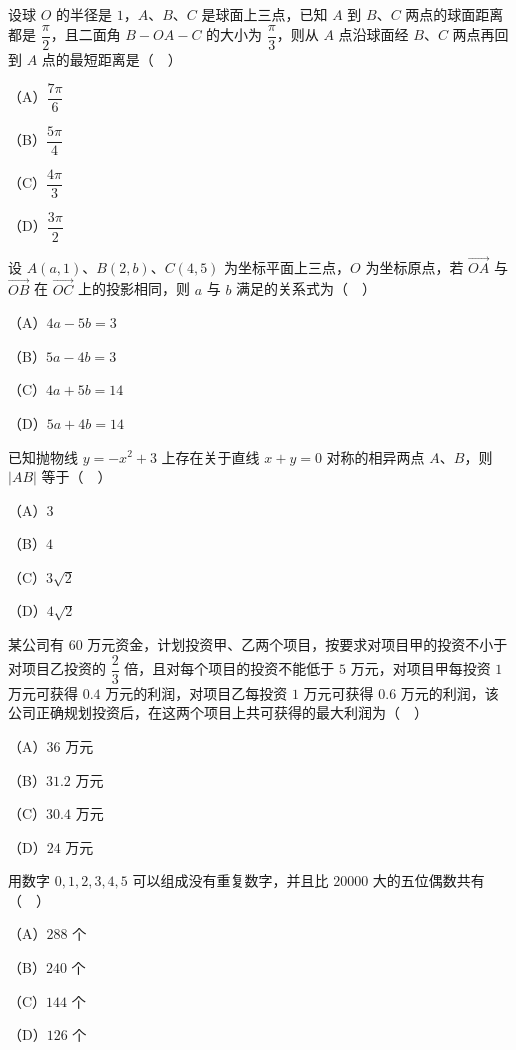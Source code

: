 \begin{question}
设球 $O$ 的半径是 $1$，$A$、$B$、$C$ 是球面上三点，已知 $A$ 到 $B$、$C$ 两点的球面距离都是 $\dfrac{\pi}{2}$，且二面角 $B-OA-C$ 的大小为 $\dfrac{\pi}{3}$，则从 $A$ 点沿球面经 $B$、$C$ 两点再回到 $A$ 点的最短距离是（　）
\nopagebreak[4]
\begin{center}\end{center}
\nopagebreak[4]
（A）$\dfrac{7\pi}{6}$

（B）$\dfrac{5\pi}{4}$

（C）$\dfrac{4\pi}{3}$

（D）$\dfrac{3\pi}{2}$

\end{question}
\begin{question}
设 $A(a,1)$、$B(2,b)$、$C(4,5)$ 为坐标平面上三点，$O$ 为坐标原点，若 $\overrightarrow{OA}$ 与 $\overrightarrow{OB}$ 在 $\overrightarrow{OC}$ 上的投影相同，则 $a$ 与 $b$ 满足的关系式为（　）

（A）$4a-5b=3$

（B）$5a-4b=3$

（C）$4a+5b=14$

（D）$5a+4b=14$

\end{question}
\begin{question}
已知抛物线 $y=-x^2+3$ 上存在关于直线 $x+y=0$ 对称的相异两点 $A$、$B$，则 $|AB|$ 等于（　）

（A）$3$

（B）$4$

（C）$3\sqrt2$

（D）$4\sqrt2$

\end{question}
\begin{question}
某公司有 $60$ 万元资金，计划投资甲、乙两个项目，按要求对项目甲的投资不小于对项目乙投资的 $\dfrac23$ 倍，且对每个项目的投资不能低于 $5$ 万元，对项目甲每投资 $1$ 万元可获得 $0.4$ 万元的利润，对项目乙每投资 $1$ 万元可获得 $0.6$ 万元的利润，该公司正确规划投资后，在这两个项目上共可获得的最大利润为（　）

（A）$36$ 万元

（B）$31.2$ 万元

（C）$30.4$ 万元

（D）$24$ 万元

\end{question}
\begin{question}
用数字 $0,1,2,3,4,5$ 可以组成没有重复数字，并且比 $20000$ 大的五位偶数共有（　）

（A）$288$ 个

（B）$240$ 个

（C）$144$ 个

（D）$126$ 个

\Needspace{0.4\textheight}
\end{question}
